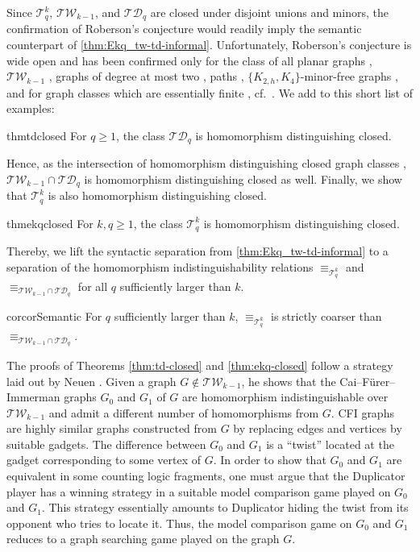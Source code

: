 \documentclass{lmcs}
\theoremstyle{plain}\newtheorem{claim}[thm]{Claim}   %
\newcommand{\cT}{\ensuremath{\mathcal T}}
\newcommand{\TW}{\ensuremath{\mathcal{TW}}}
\newcommand{\TD}{\ensuremath{\mathcal{TD}}}
\newcommand{\Ekq}{\ensuremath{\cT_{q}^{k}}}
\begin{document}
Since $\Ekq$, $\mathcal{TW}_{k-1}$, and $\mathcal{TD}_q$ are closed under disjoint unions and minors, the confirmation of Roberson's conjecture would readily imply the semantic counterpart of \autoref{thm:Ekq_tw-td-informal}. Unfortunately, Roberson's conjecture is wide open and has been confirmed only for the class of all planar graphs \cite{roberson_oddomorphisms_2022}, $\mathcal{TW}_{k-1}$ \cite{neuen_homomorphism-distinguishing_2023}, graphs of degree at most two \cite{roberson_oddomorphisms_2022}, paths \cite{roberson_oddomorphisms_2022}, $\{K_{2,h}, K_4\}$-minor-free graphs \cite{seppelt_homomorphism_2024},
and for graph classes which are essentially finite \cite{seppelt_logical_2023}, cf.\ \cite[Chapter 6]{seppelt_homomorphism_2024}.
We add to this short list of examples:

\begin{restatable}{thm}{tdclosed}
	\label{thm:td-closed}
	For $q \geq 1$, the class $\mathcal{TD}_q$ is homomorphism distinguishing closed.
\end{restatable}

Hence, as the intersection of homomorphism distinguishing closed graph classes \cite{roberson_oddomorphisms_2022}, $\TW_{k-1}\cap\TD_q$ is homomorphism distinguishing closed as well.
Finally, we show that $\Ekq$ is also homomorphism distinguishing closed.
\begin{restatable}{thm}{ekqclosed}
	\label{thm:ekq-closed}
	For $k,q \geq 1$, the class $\Ekq$ is homomorphism distinguishing closed.
\end{restatable}
Thereby, we lift the syntactic separation from \autoref{thm:Ekq_tw-td-informal} to a separation of the homomorphism indistinguishability relations $\equiv_{\Ekq}$ and $\equiv_{\TW_{k-1}\cap\TD_q}$ for all $q$ sufficiently larger than $k$.
\begin{restatable}{cor}{corSemantic}\label{cor:semantic}
	For $q$ sufficiently larger than $k$, $\equiv_{\Ekq}$ is strictly coarser than $\equiv_{\TW_{k-1}\cap\TD_q}$.
\end{restatable}

The proofs of Theorems \ref{thm:td-closed} and \ref{thm:ekq-closed} follow a strategy laid out by Neuen \cite{neuen_homomorphism-distinguishing_2023}.
Given a graph $G \not\in \TW_{k-1}$, he shows that the Cai--Fürer--Immerman graphs $G_0$ and $G_1$ of $G$ are homomorphism indistinguishable over $\TW_{k-1}$ and admit a different number of homomorphisms from $G$.
CFI graphs \cite{Cai_optimal_1992,roberson_oddomorphisms_2022} are highly similar graphs constructed from $G$ by replacing edges and vertices by suitable gadgets.
The difference between $G_0$ and $G_1$ is a \enquote{twist} located at the gadget corresponding to some vertex of $G$.
In order to show that $G_0$ and $G_1$ are equivalent in some counting logic fragments,
one must argue that the Duplicator player has a winning strategy in a suitable model comparison game played on $G_0$ and $G_1$.
This strategy essentially amounts to Duplicator hiding the twist from its opponent who tries to locate it.
Thus, the model comparison game on $G_0$ and $G_1$ reduces to a graph searching game played on the graph $G$.
\end{document}
